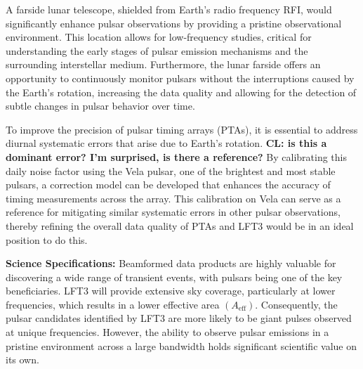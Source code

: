 A farside lunar telescope, shielded from Earth’s radio frequency RFI, would significantly enhance pulsar observations by providing a pristine observational environment. This location allows for low-frequency studies, critical for understanding the early stages of pulsar emission mechanisms and the surrounding interstellar medium. Furthermore, the lunar farside offers an opportunity to continuously monitor pulsars without the interruptions caused by the Earth’s rotation, increasing the data quality and allowing for the detection of subtle changes in pulsar behavior over time.

To improve the precision of pulsar timing arrays (PTAs), it is essential to address diurnal systematic errors that arise due to Earth's rotation. \textbf{CL: is this a dominant error? I'm surprised, is there a reference?} By calibrating this daily noise factor using the Vela pulsar, one of the brightest and most stable pulsars, a correction model can be developed that enhances the accuracy of timing measurements across the array. This calibration on Vela can serve as a reference for mitigating similar systematic errors in other pulsar observations, thereby refining the overall data quality of PTAs and LFT3 would be in an ideal position to do this. 

\textbf{Science Specifications:} Beamformed data products are highly valuable for discovering a wide range of transient events, with pulsars being one of the key beneficiaries. LFT3 will provide extensive sky coverage, particularly at lower frequencies, which results in a lower effective area $(A_{\text{eff}})$. Consequently, the pulsar candidates identified by LFT3 are more likely to be giant pulses observed at unique frequencies. However, the ability to observe pulsar emissions in a pristine environment across a large bandwidth holds significant scientific value on its own. 




